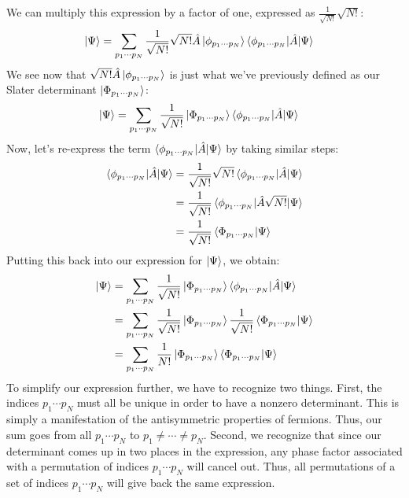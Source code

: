 \documentclass{article}
\begin{document}
We can multiply this expression by a factor of one, expressed as $\frac{1}{\sqrt{N!}} \sqrt{N!}$: 
\begin{align*}
\ket{\Psi} &=\sum_{p_1 \cdots p_N}  \frac{1}{\sqrt{N!}} \sqrt{N!} \hat{A} \ket{\phi_{p_1 \cdots p_N}} \braket{\phi_{p_1 \cdots p_N} | \hat{A} | \Psi} 
\end{align*}
We see now that $\sqrt{N!} \hat{A} \ket{\phi_{p_1 \cdots p_N}}$ is just what we've previously defined as our Slater determinant $\ket{\Phi_{p_1 \cdots p_N}}$: 
\begin{align*}
\ket{\Psi} &=\sum_{p_1 \cdots p_N}  \frac{1}{\sqrt{N!}} \ket{\Phi_{p_1 \cdots p_N}} \braket{\phi_{p_1 \cdots p_N} | \hat{A} | \Psi} 
\end{align*}
Now, let's re-express the term $ \braket{\phi_{p_1 \cdots p_N} | \hat{A} | \Psi} $ by taking similar steps: 
\begin{align*}
\braket{\phi_{p_1 \cdots p_N} | \hat{A} | \Psi} &=  \frac{1}{\sqrt{N!}} {\sqrt{N!}} \braket{\phi_{p_1 \cdots p_N} | \hat{A} | \Psi}  \\
&=  \frac{1}{\sqrt{N!}}\braket{\phi_{p_1 \cdots p_N} | \hat{A}  {\sqrt{N!}}  | \Psi}  \\
&= \frac{1}{\sqrt{N!}}\braket{\Phi_{p_1 \cdots p_N} | \Psi}  
\end{align*}
Putting this back into our expression for $\ket{\Psi}$, we obtain: 
\begin{align*}
\ket{\Psi} &=\sum_{p_1 \cdots p_N}  \frac{1}{\sqrt{N!}} \ket{\Phi_{p_1 \cdots p_N}} \braket{\phi_{p_1 \cdots p_N} | \hat{A} | \Psi}  \\
 &=\sum_{p_1 \cdots p_N}  \frac{1}{\sqrt{N!}} \ket{\Phi_{p_1 \cdots p_N}}\frac{1}{\sqrt{N!}}\braket{\Phi_{p_1 \cdots p_N} | \Psi}   \\
&=\sum_{p_1 \cdots p_N}  \frac{1}{N!} \ket{\Phi_{p_1 \cdots p_N}}\braket{\Phi_{p_1 \cdots p_N} | \Psi}   \\
\end{align*}
To simplify our expression further, we have to recognize two things. 
First, the indices $p_1 \cdots p_N$ must all be unique in order to have a nonzero determinant. 
This is simply a manifestation of the antisymmetric properties of fermions. 
Thus, our sum goes from all $p_1 \cdots p_N$ to $p_1 \neq \cdots \neq p_N$. 
Second, we recognize that since our determinant comes up in two places in the expression, any phase factor associated with a permutation of indices $p_1 \cdots p_N$ will cancel out. 
Thus, all permutations of a set of indices $p_1 \cdots p_N$ will give back the same expression.
\end{document}
